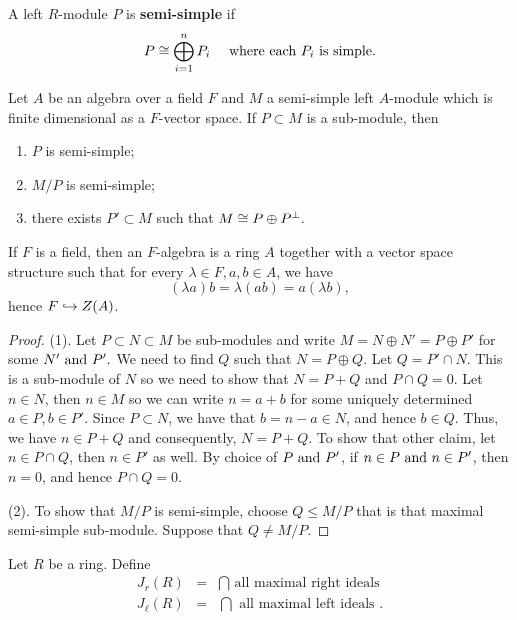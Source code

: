 \begin{defn}\label{1.9}
A left $R$-module $P$ is \textbf{semi-simple} if $$P \cong \bigoplus_{i=1}^n P_i \quad \text{ where each $P_i$ is simple.}$$
\end{defn}
\begin{prop}\label{1.10}
Let $A$ be an algebra over a field $F$ and $M$ a semi-simple left $A$-module which is finite dimensional as a $F$-vector space. If $P \subset M$ is a sub-module, then 
\begin{enumerate}
\item $P$ is semi-simple;
\item $M/P$ is semi-simple;
\item there exists $P' \subset M$ such that $M \cong P \oplus P^{\perp}.$
\end{enumerate}
\end{prop}
\begin{remark}\label{1.11}
If $F$ is a field, then an $F$-algebra is a ring $A$ together with a vector space structure such that for every $\lambda \in F, a,b \in A$, we have $$(\lambda a)b = \lambda (ab) = a(\lambda b), $$
hence $F \hookrightarrow Z(A)$.
\end{remark}
\begin{proof}
(1). Let $P\subset N \subset M$ be sub-modules and write $M = N\oplus N' = P\oplus P'$ for some $N'\text{ and } P'.$ We need to find $Q$ such that $N = P\oplus Q$. Let $Q = P'\cap N$. This is a sub-module of $N$ so we need to show that $N = P+Q$ and $P\cap Q = 0$. Let $n \in N$, then $n \in M$ so we can write $n = a + b$ for some uniquely determined $a \in P,b\in P'$. Since $P\subset N$, we have that $b = n -a \in N$, and hence $b \in Q$. Thus, we have $n\in P+Q$ and consequently, $N = P+Q$. To show that other claim, let $n \in P \cap Q$, then $n \in P'$ as well. By choice of $P \text{ and } P'$, if $n \in P \text{ and } n \in P'$, then $n = 0$, and hence $P \cap Q = 0$.

(2). To show that $M/P$ is semi-simple, choose $Q \leq M/P$ that is that maximal semi-simple sub-module. Suppose that $Q \neq M/P$. 
\end{proof}

\begin{defn}\label{1.12}
Let $R$ be a ring. Define
\begin{eqnarray*}
J_r(R) & = & \bigcap \text{ all maximal right ideals} \\
J_{\ell}(R) & = & \bigcap \text{ all maximal left ideals }.
\end{eqnarray*}
\end{defn}

